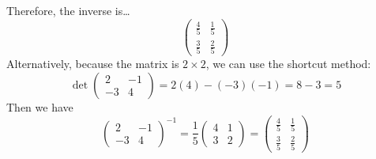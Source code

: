 \documentclass[11pt,letterpaper]{article}
\begin{document}
Therefore, the inverse is\dots
	\[
	\begin{pmatrix}
	\frac{4}{5} & \frac{1}{5} \\[0.2cm]
	\frac{3}{5} & \frac{2}{5}
	\end{pmatrix}
	\]
Alternatively, because the matrix is $2 \times 2$, we can use the shortcut method:
	\[
	\det 	
	\begin{pmatrix}
	2 & -1 \\
	-3 & 4
	\end{pmatrix}
	= 2(4) - (-3)(-1)= 8 - 3= 5
	\]
Then we have
	\[
	\begin{pmatrix}
	2 & -1 \\
	-3 & 4
	\end{pmatrix}^{-1}=
	\dfrac{1}{5}
	\begin{pmatrix}
	4 & 1 \\
	3 & 2 
	\end{pmatrix}=
	\begin{pmatrix}
	\frac{4}{5} & \frac{1}{5} \\[0.2cm]
	\frac{3}{5} & \frac{2}{5}
	\end{pmatrix}	
	\]
\end{document}
